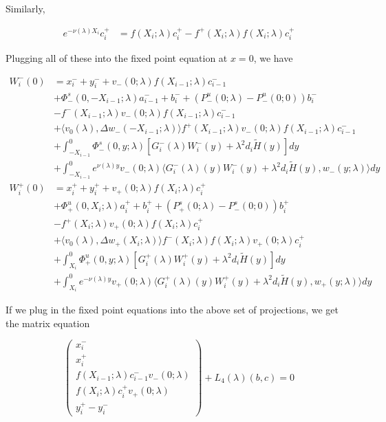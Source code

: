 \documentclass[12pt]{article}
\begin{document}
\begin{enumerate}
Similarly,

\begin{align*}
e^{-\nu(\lambda)X_i} c_i^+ &= f(X_i; \lambda) c_i^+ - f^+(X_i; \lambda)f(X_i; \lambda) c_i^+
\end{align*}

Plugging all of these into the fixed point equation at $x = 0$, we have

\begin{align*}
W_i^-(0) &= x_i^- + y_i^- + v_-(0; \lambda) f(X_{i-1}; \lambda) c_{i-1}^-  \\
&+\Phi^s_-(0, -X_{i-1}; \lambda)a_{i-1}^- + b_i^- + (P^u_-(0; \lambda) - P^u_-(0; 0))b_i^- \\
&- f^-(X_{i-1}; \lambda) v_-(0; \lambda) f(X_{i-1}; \lambda) c_{i-1}^- \\
&+ \langle v_0(\lambda), \Delta w_-(-X_{i-1}; \lambda) \rangle 
f^+(X_{i-1}; \lambda) v_-(0; \lambda) f(X_{i-1}; \lambda) c_{i-1}^- \\
&+ \int_{-X_{i-1}}^0 \Phi^s_-(0, y; \lambda) [ G_i^-(\lambda)W_i^-(y) + \lambda^2 d_i \tilde{H}(y) ] dy \\
&+ \int_{-X_{i-1}}^0
e^{\nu(\lambda)y} v_-(0; \lambda) \langle G_i^-(\lambda)(y)W_i^-(y) + \lambda^2 d_i \tilde{H}(y), w_-(y; \lambda) \rangle dy \\
W_i^+(0) &= x_i^+ + y_i^+ + v_+(0; \lambda) f(X_i; \lambda) c_i^+ \\
&+\Phi^u_+(0, X_i; \lambda)a_i^+ + b_i^+ + (P^s_+(0; \lambda) - P^s_-(0; 0))b_i^+ \\
&- f^+(X_i; \lambda) v_+(0; \lambda) f(X_i; \lambda) c_i^+ \\
&+ \langle v_0(\lambda), \Delta w_+(X_i; \lambda) \rangle 
f^-(X_i; \lambda)f(X_i; \lambda) v_+(0; \lambda) c_i^+ \\
&+ \int_{X_i}^0 \Phi^u_+(0, y; \lambda) [ G_i^+(\lambda)W_i^+(y) + \lambda^2 d_i \tilde{H}(y) ] dy \\
&+ \int_{X_i}^0 e^{-\nu(\lambda)y} v_+(0; \lambda) \langle G_i^+(\lambda)(y)W_i^+(y) + \lambda^2 d_i \tilde{H}(y), w_+(y; \lambda) \rangle dy
\end{align*}

If we plug in the fixed point equations into the above set of projections, we get the matrix equation

\[
\begin{pmatrix}x_i^- \\ x_i^+ \\ 
f(X_{i-1}; \lambda) c_{i-1}^- v_-(0; \lambda) \\
f(X_i; \lambda) c_i^+ v_+(0; \lambda) \\
y_i^+ - y_i^- \end{pmatrix} + L_4(\lambda)(b, c) = 0
\]



\end{enumerate}
\end{document}
